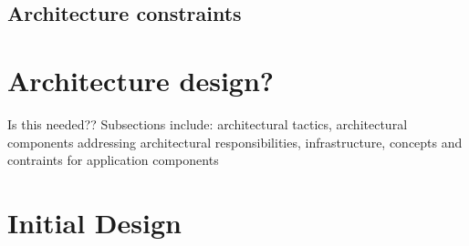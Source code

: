 \documentclass[a4paper,12pt]{article}
\begin{document}
\subsection{Architecture constraints}

\section{Architecture design?}
	Is this needed?? Subsections include: architectural tactics, architectural components addressing architectural responsibilities, infrastructure, concepts and contraints for application components

\newpage
%
%




\section{Initial Design}  %


\newpage
%
%
\end{document}
